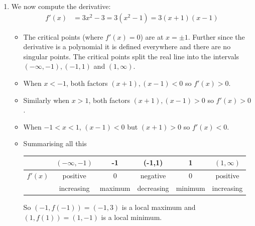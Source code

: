 \begin{eg}[Sketch $f(x)=x^3-3x+1$]
\begin{enumerate}[(1)]
\item We now compute the derivative:
\begin{align*}
f'(x) &= 3x^2-3 = 3(x^2-1)=3(x+1)(x-1)
\end{align*}
\begin{itemize}
 \item The critical points (where $f'(x)=0$) are at $x=\pm 1$. Further since the
derivative is a polynomial it is defined everywhere and there are no singular points.
The critical points split the real line into the intervals $(-\infty,-1),(-1,1)$
and $(1,\infty)$.
\item When $x<-1$, both factors $(x+1),(x-1)<0$ so $f'(x)>0$.
\item Similarly when $x>1$, both factors $(x+1),(x-1)>0$ so $f'(x)>0$.
\item When $-1<x<1$, $(x-1)<0$ but $(x+1)>0$ so $f'(x)<0$.
\item Summarising all this
\begin{center}
 \begin{tabular}{|c|c||c||c||c||c|}
\hline
  & $(-\infty,-1)$ & -1 & (-1,1) & 1 & $(1,\infty)$\\
\hline
$f'(x)$  & positive  & 0 & negative & 0 & positive \\
\hline
 & increasing & maximum & decreasing & minimum & increasing \\
\hline
 \end{tabular}
\end{center}

So $(-1,f(-1))=(-1,3)$ is a local maximum and $(1,f(1))=(1,-1)$ is a local
minimum.

\end{itemize}


\end{enumerate}
\end{eg}
